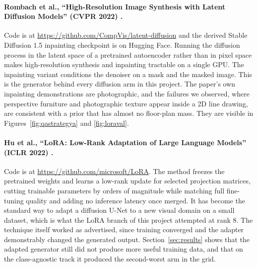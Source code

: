 \paragraph{Rombach et al., ``High-Resolution Image Synthesis with Latent
Diffusion Models'' (CVPR 2022) \cite{rombach2022ldm}.} Code is at
\url{https://github.com/CompVis/latent-diffusion} and the derived Stable
Diffusion 1.5 inpainting checkpoint is on Hugging Face. Running the diffusion
process in the latent space of a pretrained autoencoder rather than in pixel
space makes high-resolution synthesis and inpainting tractable on a single GPU.
The inpainting variant conditions the denoiser on a mask and the masked image.
This is the generator behind every diffusion arm in this project. The paper's
own inpainting demonstrations are photographic, and the failures we observed,
where perspective furniture and photographic texture appear inside a 2D line
drawing, are consistent with a prior that has almost no floor-plan mass. They
are visible in Figures~\ref{fig:qastrategya} and \ref{fig:loraval}.

\paragraph{Hu et al., ``LoRA: Low-Rank Adaptation of Large Language Models''
(ICLR 2022) \cite{hu2022lora}.} Code is at
\url{https://github.com/microsoft/LoRA}. The method freezes the pretrained
weights and learns a low-rank update for selected projection matrices, cutting
trainable parameters by orders of magnitude while matching full fine-tuning
quality and adding no inference latency once merged. It has become the standard
way to adapt a diffusion U-Net to a new visual domain on a small dataset, which
is what the LoRA branch of this project attempted at rank 8. The technique
itself worked as advertised, since training converged and the adapter
demonstrably changed the generated output. Section~\ref{sec:results} shows that
the adapted generator still did not produce more useful training data, and that
on the class-agnostic track it produced the second-worst arm in the grid.
